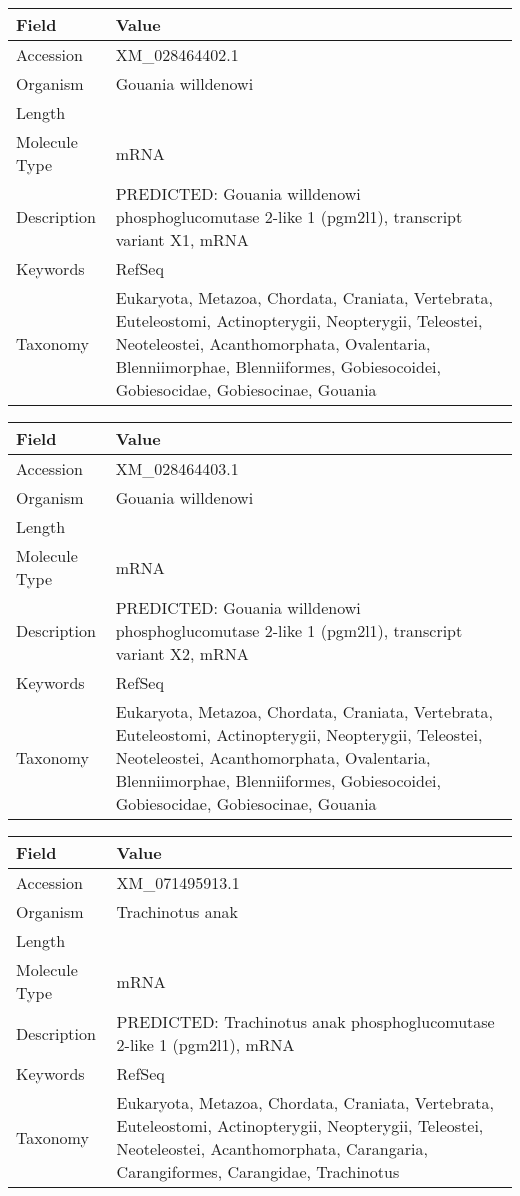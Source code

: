 \documentclass[10pt]{article}
\begin{document}
\vspace{1em}
{\footnotesize
\begin{longtable}{>{\raggedright\arraybackslash}p{4.5cm} >{\raggedright\arraybackslash}p{11.5cm}}
\textbf{Field} & \textbf{Value} \\
\hline
Accession & XM\_028464402.1 \\
Organism & Gouania willdenowi \\
Length & 2323 \\
Molecule Type & mRNA \\
Description & PREDICTED: Gouania willdenowi phosphoglucomutase 2-like 1 (pgm2l1), transcript variant X1, mRNA \\
Keywords & RefSeq \\
Taxonomy & Eukaryota, Metazoa, Chordata, Craniata, Vertebrata, Euteleostomi, Actinopterygii, Neopterygii, Teleostei, Neoteleostei, Acanthomorphata, Ovalentaria, Blenniimorphae, Blenniiformes, Gobiesocoidei, Gobiesocidae, Gobiesocinae, Gouania \\
\end{longtable}
}

\vspace{1em}
{\footnotesize
\begin{longtable}{>{\raggedright\arraybackslash}p{4.5cm} >{\raggedright\arraybackslash}p{11.5cm}}
\textbf{Field} & \textbf{Value} \\
\hline
Accession & XM\_028464403.1 \\
Organism & Gouania willdenowi \\
Length & 2322 \\
Molecule Type & mRNA \\
Description & PREDICTED: Gouania willdenowi phosphoglucomutase 2-like 1 (pgm2l1), transcript variant X2, mRNA \\
Keywords & RefSeq \\
Taxonomy & Eukaryota, Metazoa, Chordata, Craniata, Vertebrata, Euteleostomi, Actinopterygii, Neopterygii, Teleostei, Neoteleostei, Acanthomorphata, Ovalentaria, Blenniimorphae, Blenniiformes, Gobiesocoidei, Gobiesocidae, Gobiesocinae, Gouania \\
\end{longtable}
}

\vspace{1em}
{\footnotesize
\begin{longtable}{>{\raggedright\arraybackslash}p{4.5cm} >{\raggedright\arraybackslash}p{11.5cm}}
\textbf{Field} & \textbf{Value} \\
\hline
Accession & XM\_071495913.1 \\
Organism & Trachinotus anak \\
Length & 4165 \\
Molecule Type & mRNA \\
Description & PREDICTED: Trachinotus anak phosphoglucomutase 2-like 1 (pgm2l1), mRNA \\
Keywords & RefSeq \\
Taxonomy & Eukaryota, Metazoa, Chordata, Craniata, Vertebrata, Euteleostomi, Actinopterygii, Neopterygii, Teleostei, Neoteleostei, Acanthomorphata, Carangaria, Carangiformes, Carangidae, Trachinotus \\
\end{longtable}
}
\end{document}
